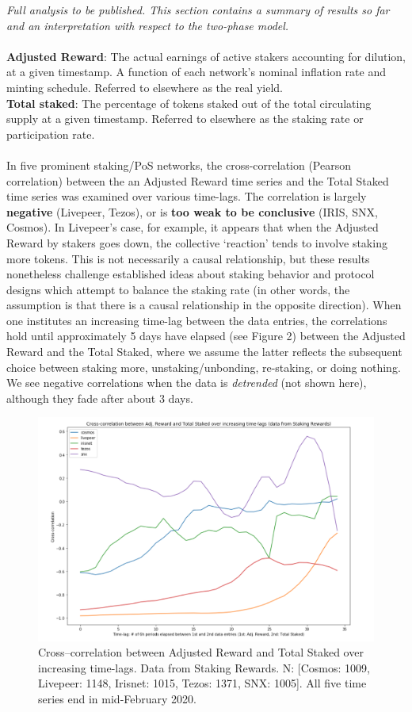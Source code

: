 \documentclass[8pt]{article}
\begin{document}
\textit{Full analysis to be published. This section contains a summary of results so far and an interpretation with respect to the two-phase model.}
\\\\
\textbf{Adjusted Reward}: The actual earnings of active stakers accounting for dilution, at a given timestamp. A function of each network's nominal inflation rate and minting schedule. Referred to elsewhere as the real yield.
\\
\textbf{Total staked}: The percentage of tokens staked out of the total circulating supply at a given timestamp. Referred to elsewhere as the staking rate or participation rate.
\\\\
In five prominent staking/PoS networks, the cross-correlation (Pearson correlation) between the an Adjusted Reward time series and the Total Staked time series was examined over various time-lags. The correlation is largely \textbf{negative} (Livepeer, Tezos), or is \textbf{too weak to be conclusive} (IRIS, SNX, Cosmos). In Livepeer's case, for example, it appears that when the Adjusted Reward by stakers goes down, the collective `reaction' tends to involve staking more tokens. This is not necessarily a causal relationship, but these results nonetheless challenge established ideas about staking behavior and protocol designs which attempt to balance the staking rate (in other words, the assumption is that there is a causal relationship in the opposite direction). When one institutes an increasing time-lag between the data entries, the correlations hold until approximately 5 days have elapsed (see Figure 2) between the Adjusted Reward and the Total Staked, where we assume the latter reflects the subsequent choice between staking more, unstaking/unbonding, re-staking, or doing nothing. We see negative correlations when the data is \textit{detrended} (not shown here), although they fade after about 3 days.

\begin{figure}[h!]
    \includegraphics[width=\textwidth]{lagged_correlation_SR.png}
    \caption{Cross–correlation between Adjusted Reward and Total Staked over increasing time-lags. Data from Staking Rewards. N: [Cosmos: 1009, Livepeer: 1148, Irisnet: 1015, Tezos: 1371, SNX: 1005]. All five time series end in mid-February 2020.}
    \label{fig:tp}
\end{figure}
\end{document}
